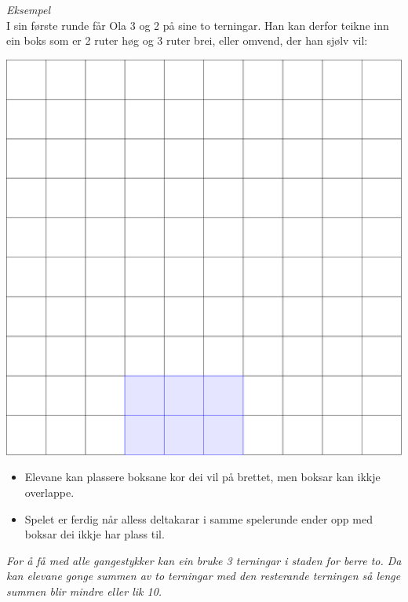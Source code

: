 {	\textit{Eksempel} \\
	I sin første runde får Ola 3 og 2 på sine to terningar. Han kan derfor teikne inn ein boks som er 2 ruter høg og 3 ruter brei, eller omvend, der han sjølv vil:
\begin{center}
	\includegraphics[scale=0.075]{gong1b}
\end{center}
\begin{itemize}
	\item Elevane kan plassere boksane kor dei vil på brettet, men boksar kan ikkje overlappe.
\item Spelet er ferdig når alless deltakarar i samme spelerunde ender opp med boksar dei ikkje har plass til.
\end{itemize}
\textit{For å få med alle gangestykker kan ein bruke 3 terningar i staden for berre to. Da kan elevane gonge summen av to terningar med den resterande terningen så lenge summen blir mindre eller lik 10.}
}





	
